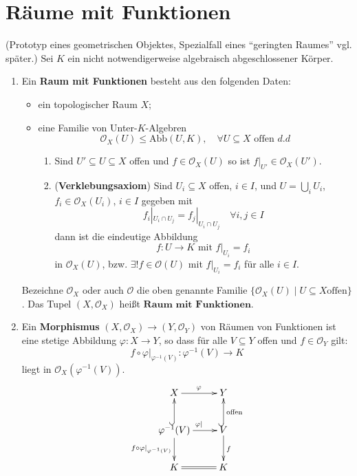 
\section{Räume mit Funktionen}
\label{sec:raeume-mit-funktionen}

(Prototyp eines geometrischen Objektes, Spezialfall eines ``geringten
Raumes'' vgl. später.) Sei $K$ ein nicht notwendigerweise algebraisch abgeschlossener
Körper.
\begin{defn}
  \label{def:raum-mit-funktionen}
  \mbox{}
  \begin{enumerate}
  \item Ein \textbf{Raum mit Funktionen} besteht
    aus den folgenden Daten:
    \begin{itemize}
    \item ein topologischer Raum $X$;
    \item eine Familie von Unter-$K$-Algebren
      \[
        \mathcal{O}_X(U)\leq\text{Abb}(U,K),\quad\forall U\subseteq X\text{ offen }d.d
      \]

      \begin{enumerate}
      \item Sind $U'\subseteq U\subseteq X$ offen und $f\in\mathcal{O}_X(U)$ so ist
        $f|_{U'}\in \mathcal{O}_X(U')$.
      \item (\textbf{Verklebungsaxiom}) Sind $U_{i}\subseteq X$
        offen, $i\in I$, und $U=\bigcup_{i}U_{i}$, $f_{i}\in\mathcal{O}_X(U_{i})$,
        $i\in I$ gegeben mit
        \[
          f_{i}|_{U_{i}\cap U_{j}}=f_{j}|_{U_{i}\cap U_{j}}\quad\forall i,j\in I
        \]
        dann ist die eindeutige Abbildung
        \[
          f:U\rightarrow K\text{ mit }f|_{U_{i}}=f_{i}
        \]
        in $\mathcal{O}_X(U)$, bzw. $\exists!f\in\mathcal{O}(U)$ mit $f|_{U_{i}}=f_{i}$ für alle $i \in I$.
      \end{enumerate}
    \end{itemize}
    Bezeichne $\mathcal{O}_X$ oder auch $\mathcal{O}$ die oben genannte
    Familie $\{\mathcal{O}_X(U) \mid U \subseteq X \text{offen}\}$. Das Tupel $(X,\mathcal{O}_{X})$ heißt $\textbf{Raum mit Funktionen}$.
  \item Ein \textbf{Morphismus} $(X,\mathcal{O}_{X})\rightarrow(Y,\mathcal{O}_{Y})$
    von Räumen von Funktionen ist eine stetige Abbildung $\varphi:X\rightarrow Y$,
    so dass für alle $V\subseteq Y$ offen und $f\in\mathcal{O}_{Y}$
    gilt:
    \[
      f\circ \varphi|_{\varphi^{-1}(V)}:\varphi^{-1}(V)\rightarrow K
    \]
    liegt in $\mathcal{O}_{X}(\varphi^{-1}(V))$.
    \[
      \xymatrix{X\ar[r]^{\varphi} & Y\\
        \varphi^{-1}(V)\ar[r]^{\varphi|}\ar[d]_{f\circ \varphi|_{\varphi^{-1}(V)}}\ar@{^{(}->}[u] & V\ar[d]^{f}\ar@{^{(}->}[u]_{\text{offen}}\\
        K\ar@{=}[r] & K
      }
    \]
  \end{enumerate}
\end{defn}
